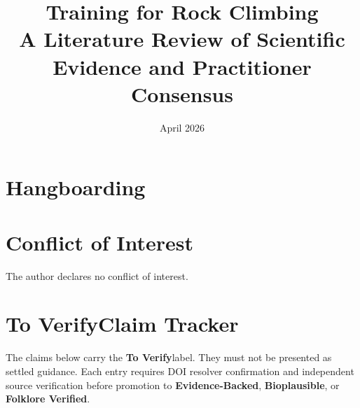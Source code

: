 \documentclass[12pt,a4paper]{article}
\title{\textbf{Training for Rock Climbing}\\[0.3em]
\large A Literature Review of Scientific Evidence and Practitioner Consensus}
\author{}
\date{April 2026}
\newcommand{\toverify}{\textbf{To Verify}}
\newcommand{\bioplausible}{\textbf{Bioplausible}}
\newcommand{\folkloreverified}{\textbf{Folklore Verified}}
\newcommand{\evidencebacked}{\textbf{Evidence-Backed}}
\begin{document}
\maketitle
\tableofcontents
\newpage





\section{Hangboarding}
\label{sec:hangboarding}













\section*{Conflict of Interest}
The author declares no conflict of interest.

\appendix
\section{\toverify Claim Tracker}
\label{app:toverify}

The claims below carry the \toverify label. They must not be presented as settled guidance. Each entry requires DOI resolver confirmation and independent source verification before promotion to \evidencebacked, \bioplausible, or \folkloreverified.
\end{document}
